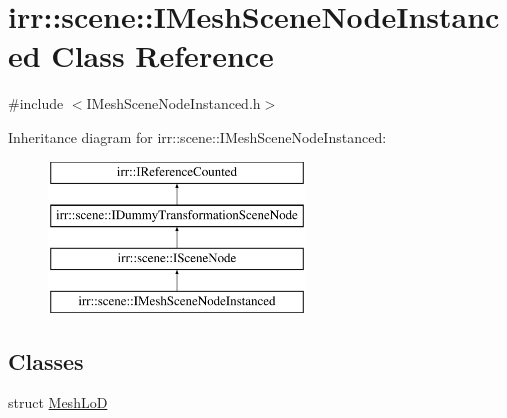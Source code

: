 \hypertarget{classirr_1_1scene_1_1IMeshSceneNodeInstanced}{}\section{irr\+:\+:scene\+:\+:I\+Mesh\+Scene\+Node\+Instanced Class Reference}
\label{classirr_1_1scene_1_1IMeshSceneNodeInstanced}


{\ttfamily \#include $<$I\+Mesh\+Scene\+Node\+Instanced.\+h$>$}

Inheritance diagram for irr\+:\+:scene\+:\+:I\+Mesh\+Scene\+Node\+Instanced\+:\begin{figure}[H]
\begin{center}
\leavevmode
\includegraphics[height=4.000000cm]{classirr_1_1scene_1_1IMeshSceneNodeInstanced}
\end{center}
\end{figure}
\subsection*{Classes}
\begin{DoxyCompactItemize}
\item 
struct \hyperlink{structirr_1_1scene_1_1IMeshSceneNodeInstanced_1_1MeshLoD}{Mesh\+LoD}
\end{DoxyCompactItemize}
